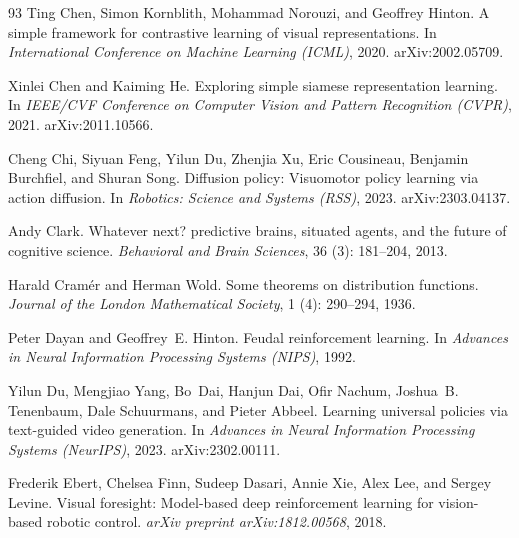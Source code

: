 \begin{thebibliography}{93}
Ting Chen, Simon Kornblith, Mohammad Norouzi, and Geoffrey Hinton.
\newblock A simple framework for contrastive learning of visual
  representations.
\newblock In \emph{International Conference on Machine Learning (ICML)}, 2020.
\newblock arXiv:2002.05709.

Xinlei Chen and Kaiming He.
\newblock Exploring simple siamese representation learning.
\newblock In \emph{IEEE/CVF Conference on Computer Vision and Pattern
  Recognition (CVPR)}, 2021.
\newblock arXiv:2011.10566.

Cheng Chi, Siyuan Feng, Yilun Du, Zhenjia Xu, Eric Cousineau, Benjamin
  Burchfiel, and Shuran Song.
\newblock Diffusion policy: Visuomotor policy learning via action diffusion.
\newblock In \emph{Robotics: Science and Systems (RSS)}, 2023.
\newblock arXiv:2303.04137.

Andy Clark.
\newblock Whatever next? predictive brains, situated agents, and the future of
  cognitive science.
\newblock \emph{Behavioral and Brain Sciences}, 36 (3):
  181--204, 2013.

Harald Cram{\'e}r and Herman Wold.
\newblock Some theorems on distribution functions.
\newblock \emph{Journal of the London Mathematical Society}, 1
  (4): 290--294, 1936.

Peter Dayan and Geoffrey~E. Hinton.
\newblock Feudal reinforcement learning.
\newblock In \emph{Advances in Neural Information Processing Systems (NIPS)},
  1992.

Yilun Du, Mengjiao Yang, Bo~Dai, Hanjun Dai, Ofir Nachum, Joshua~B. Tenenbaum,
  Dale Schuurmans, and Pieter Abbeel.
\newblock Learning universal policies via text-guided video generation.
\newblock In \emph{Advances in Neural Information Processing Systems
  (NeurIPS)}, 2023.
\newblock arXiv:2302.00111.

Frederik Ebert, Chelsea Finn, Sudeep Dasari, Annie Xie, Alex Lee, and Sergey
  Levine.
\newblock Visual foresight: Model-based deep reinforcement learning for
  vision-based robotic control.
\newblock \emph{arXiv preprint arXiv:1812.00568}, 2018.


\end{thebibliography}
